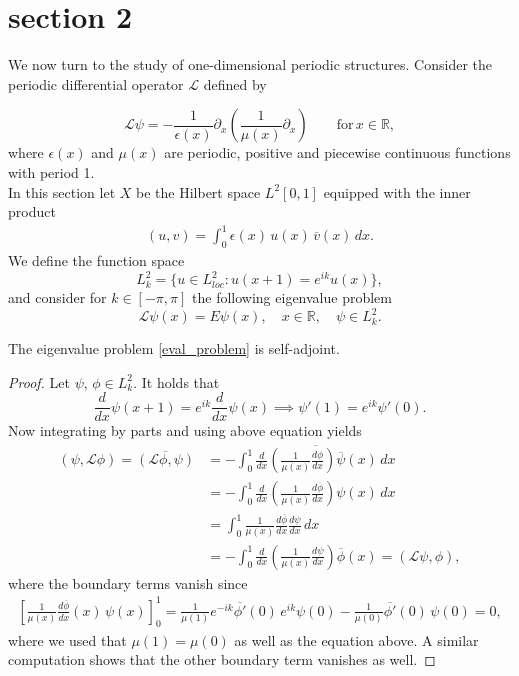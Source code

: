 \section{section 2}
We now turn to the study of one-dimensional periodic structures. Consider the periodic differential operator $\mathcal{L}$ defined by

\begin{equation}
    \mathcal{L}\psi = - \frac{1}{\epsilon(x)} \partial_x \left( \frac{1}{\mu(x)} \partial_x \right) \qquad \mathrm{for}\, x \in \mathbb{R},
\end{equation}
%
where $\epsilon(x)$ and $\mu(x)$ are periodic, positive and piecewise continuous functions with period 1.\\
In this section let $X$ be the Hilbert space $L^2[0,1]$ equipped with the inner product
\begin{align*}
    (u,v) = \int_0^1 \epsilon(x)\, u(x)\, \overline{v}(x)\, dx.
\end{align*}
We define the function space
\begin{equation*}
    L_k^2 = \{ u \in L_{loc}^2 : u(x+1) = e^{ik} u(x) \},
\end{equation*}
and consider for $k \in [-\pi,\pi]$ the following eigenvalue problem
\begin{equation}\label{eval_problem}
    \mathcal{L}\psi(x) = E \psi(x), \quad x \in \mathbb{R}, \quad \psi \in L^2_k.
\end{equation}
\begin{lemma}
    The eigenvalue problem \eqref{eval_problem} is self-adjoint.
\end{lemma}
\begin{proof}
    Let $\psi$, $\phi \in L_k^2$. It holds that
    \[ \frac{d}{dx} \psi(x+1) = e^{ik} \frac{d}{dx}\psi(x) \implies \psi'(1) = e^{ik}\psi'(0).\]
    Now integrating by parts and using above equation yields
    \begin{align*}
    (\psi,\mathcal{L}\phi) = \overline{(\mathcal{L}\phi,\psi)} &= -\overline{\int_0^1 \frac{d}{dx}\left(\frac{1}{\mu(x)} \frac{d\phi}{dx}\right)\overline{\psi}(x) \, dx}\\
    &= -\int_0^1 \frac{d}{dx}\left(\frac{1}{\mu(x)} \frac{d\overline{\phi}}{dx}\right)\psi(x) \, dx\\
    &= \int_0^1 \frac{1}{\mu(x)} \frac{d \overline{\phi}}{dx} \frac{d \psi}{dx} \, dx\\
    &= -\int_0^1 \frac{d}{dx}\left(\frac{1}{\mu(x)} \frac{d\psi}{dx}\right)\overline{\phi}(x) = (\mathcal{L} \psi, \phi),
    \end{align*}
    where the boundary terms vanish since 
    \begin{align*}
        \left[ \frac{1}{\mu(x)} \frac{d \overline{\phi}}{dx}(x) \, \psi(x) \right]_0^1 = \frac{1}{\mu(1)} e^{-ik} \overline{\phi'}(0)\, e^{ik}\psi(0) - \frac{1}{\mu(0)} \overline{\phi'}(0) \, \psi(0) = 0, 
    \end{align*}
    where we used that $\mu(1) = \mu(0)$ as well as the equation above. A similar computation shows that the other boundary term vanishes as well.
\end{proof}

